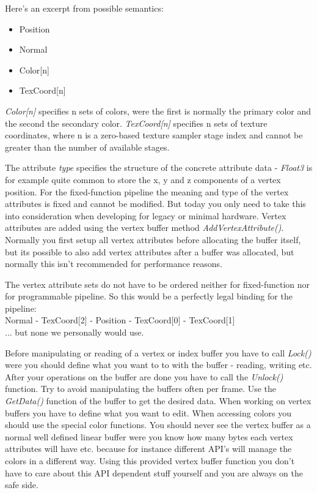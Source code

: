 Here's an excerpt from possible semantics:
\begin{itemize}
\item{Position}
\item{Normal}
\item{Color[n]}
\item{TexCoord[n]}
\end{itemize}

\emph{Color[n]} specifies n sets of colors, were the first is normally the primary color and the second the secondary color. \emph{TexCoord[n]} specifies n sets of texture coordinates, where n is a zero-based texture sampler stage index and cannot be greater than the number of available stages.

The attribute \emph{type} specifies the structure of the concrete attribute data - \emph{Float3} is for example quite common to store the x, y and z components of a vertex position. For the fixed-function pipeline the meaning and type of the vertex attributes is fixed and cannot be modified. But today you only need to take this into consideration when developing for legacy or minimal hardware. Vertex attributes are added using the vertex buffer method \emph{AddVertexAttribute()}. Normally you first setup all vertex attributes before allocating the buffer itself, but its possible to also add vertex attributes after a buffer was allocated, but normally this isn't recommended for performance reasons.

The vertex attribute sets do not have to be ordered neither for fixed-function nor for programmable pipeline. So this would be a perfectly legal binding for the pipeline:\\
Normal - TexCoord[2] - Position - TexCoord[0] - TexCoord[1]\\
... but none we personally would use.

Before manipulating or reading of a vertex or index buffer you have to call \emph{Lock()} were you should define what you want to to with the buffer - reading, writing etc. After your operations on the buffer are done you have to call the \emph{Unlock()} function. Try to avoid manipulating the buffers often per frame. Use the \emph{GetData()} function of the buffer to get the desired data. When working on vertex buffers you have to define what you want to edit. When accessing colors you should use the special color functions. You should never see the vertex buffer as a normal well defined linear buffer were you know how many bytes each vertex attributes will have etc. because for instance different API's will manage the colors in a different way. Using this provided vertex buffer function you don't have to care about this API dependent stuff yourself and you are always on the safe side.



